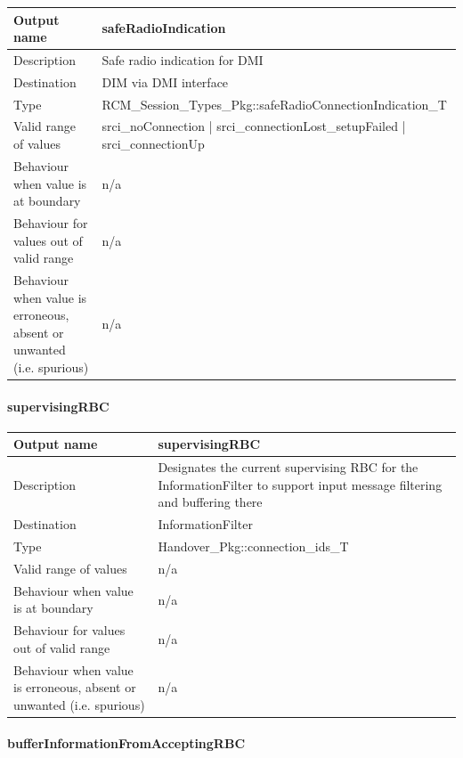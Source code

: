 \begin{longtable}{p{}p{}}
	\toprule
	Output name				& safeRadioIndication \\
	\midrule
	Description				& Safe radio indication for DMI  \\
	\midrule
	Destination				& DIM via DMI interface \\ 
	\midrule
	Type					& RCM\_Session\_Types\_Pkg::safeRadioConnectionIndication\_T \\
	\midrule
	Valid range of values	& srci\_noConnection | srci\_connectionLost\_setupFailed | srci\_connectionUp \\
	\midrule
	Behaviour when value is at boundary	& n/a \\
	\midrule
	Behaviour for values out of valid range	& n/a \\
	\midrule
	Behaviour when value is erroneous, absent or unwanted (i.e. spurious) & n/a \\
	\bottomrule
\end{longtable}

\paragraph{supervisingRBC}

\begin{longtable}{p{}p{}}
	\toprule
	Output name				& supervisingRBC \\
	\midrule
	Description				& Designates the current supervising RBC for the InformationFilter to support input message filtering and buffering there \\
	\midrule
	Destination				& InformationFilter \\ 
	\midrule
	Type					& Handover\_Pkg::connection\_ids\_T \\
	\midrule
	Valid range of values	& n/a \\
	\midrule
	Behaviour when value is at boundary	& n/a \\
	\midrule
	Behaviour for values out of valid range	& n/a \\
	\midrule
	Behaviour when value is erroneous, absent or unwanted (i.e. spurious) & n/a \\
	\bottomrule
\end{longtable}

\paragraph{bufferInformationFromAcceptingRBC}

